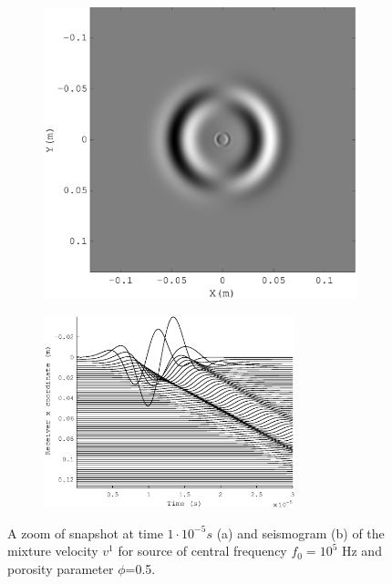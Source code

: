 \documentclass[3p,times,table]{article}
\begin{document}
\begin{figure}[!htbp]
\begin{subfigure}{0.5\linewidth}
\includegraphics[draft=false,width=1.2\textwidth]{Figures/wave_alfa_s_05_zoom1}
\caption{}
\end{subfigure}
\hfill
\begin{subfigure}{0.5\linewidth}
\includegraphics[draft=false,width=0.8\textwidth]{Figures/alfa_s_05_zoom}
\caption{}
\end{subfigure}%
\caption{A zoom of snapshot at time $1\cdot10^{-5}s$  (a) and seismogram (b) of the mixture 
velocity $v^1$  for source of central frequency $f_{0} =10^{5} $ Hz and 
porosity 
parameter $\phi$=0.5.}
\label{fig:porosity 05 zoom}
\end{figure}
\end{document}
